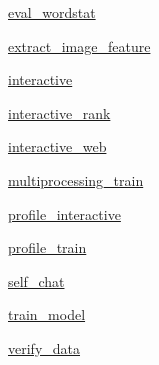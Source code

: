 \begin{DoxyCompactItemize}
 \hyperlink{namespaceparlai_1_1scripts_1_1eval__wordstat}{eval\+\_\+wordstat}
\item 
 \hyperlink{namespaceparlai_1_1scripts_1_1extract__image__feature}{extract\+\_\+image\+\_\+feature}
\item 
 \hyperlink{namespaceparlai_1_1scripts_1_1interactive}{interactive}
\item 
 \hyperlink{namespaceparlai_1_1scripts_1_1interactive__rank}{interactive\+\_\+rank}
\item 
 \hyperlink{namespaceparlai_1_1scripts_1_1interactive__web}{interactive\+\_\+web}
\item 
 \hyperlink{namespaceparlai_1_1scripts_1_1multiprocessing__train}{multiprocessing\+\_\+train}
\item 
 \hyperlink{namespaceparlai_1_1scripts_1_1profile__interactive}{profile\+\_\+interactive}
\item 
 \hyperlink{namespaceparlai_1_1scripts_1_1profile__train}{profile\+\_\+train}
\item 
 \hyperlink{namespaceparlai_1_1scripts_1_1self__chat}{self\+\_\+chat}
\item 
 \hyperlink{namespaceparlai_1_1scripts_1_1train__model}{train\+\_\+model}
\item 
 \hyperlink{namespaceparlai_1_1scripts_1_1verify__data}{verify\+\_\+data}
\end{DoxyCompactItemize}
